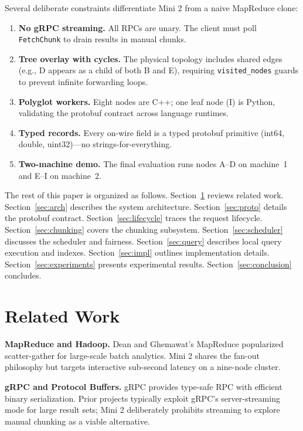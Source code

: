 \documentclass[conference]{IEEEtran}
\begin{document}
Several deliberate constraints differentiate Mini 2 from a naive MapReduce
clone:

\begin{enumerate}
  \item \textbf{No gRPC streaming.} All RPCs are unary. The client must
        poll \texttt{FetchChunk} to drain results in manual chunks.
  \item \textbf{Tree overlay with cycles.} The physical topology includes
        shared edges (e.g., D appears as a child of both B and E), requiring
        \texttt{visited\_nodes} guards to prevent infinite forwarding loops.
  \item \textbf{Polyglot workers.} Eight nodes are C++; one leaf node (I) is
        Python, validating the protobuf contract across language runtimes.
  \item \textbf{Typed records.} Every on-wire field is a typed protobuf
        primitive (int64, double, uint32)---no strings-for-everything.
  \item \textbf{Two-machine demo.} The final evaluation runs nodes A--D on
        machine~1 and E--I on machine~2.
\end{enumerate}

The rest of this paper is organized as follows. Section~\ref{sec:related}
reviews related work. Section~\ref{sec:arch} describes the system architecture.
Section~\ref{sec:proto} details the protobuf contract. Section~\ref{sec:lifecycle}
traces the request lifecycle. Section~\ref{sec:chunking} covers the chunking
subsystem. Section~\ref{sec:scheduler} discusses the scheduler and fairness.
Section~\ref{sec:query} describes local query execution and indexes.
Section~\ref{sec:impl} outlines implementation details.
Section~\ref{sec:experiments} presents experimental results.
Section~\ref{sec:conclusion} concludes.

\section{Related Work}
\label{sec:related}

\textbf{MapReduce and Hadoop.} Dean and Ghemawat's MapReduce \cite{dean2008mapreduce}
popularized scatter-gather for large-scale batch analytics. Mini 2 shares the
fan-out philosophy but targets interactive sub-second latency on a nine-node
cluster.

\textbf{gRPC and Protocol Buffers.} gRPC \cite{grpc2023} provides type-safe
RPC with efficient binary serialization. Prior projects typically exploit gRPC's
server-streaming mode for large result sets; Mini 2 deliberately prohibits
streaming to explore manual chunking as a viable alternative.
\end{document}
